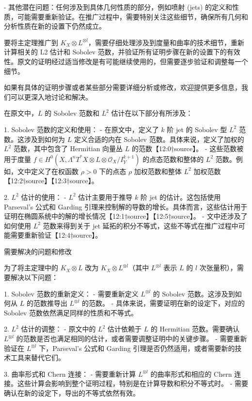 \documentclass[lang=cn,12pt,a4paper,fontset=none]{beautybook}
\begin{document}
   - 其他潜在问题：任何涉及到具体几何性质的部分，例如喷射 (jets) 的定义和性质，可能需要重新验证。在推广过程中，需要特别关注这些细节，确保所有几何和分析性质在新的设置下仍然成立。


要将主定理推广到 $K_X \otimes L^{\otimes l}$，需要仔细处理涉及到度量和曲率的技术细节，重新计算相关的 L2 估计和 Sobolev 范数，并验证所有证明步骤在新的设置下的有效性。原文的证明经过适当修改是有可能继续使用的，但需要逐步验证和调整每一个细节。

如果有具体的证明步骤或者某些部分需要详细分析或修改，欢迎提供更多信息，我们可以更深入地讨论和解决。


在原文中，$L$ 的 Sobolev 范数和 $L^2$ 估计在以下部分有所涉及：

1. Sobolev 范数的定义和使用：
   - 在原文中，定义了 $k$ 阶 jet 的 Sobolev 型 $L^2$ 范数。这涉及到如何为 $L$ 定义合适的内在 Sobolev 范数。具体来说，定义了加权的 $L^2$ 范数，其中包含了 Hermitian 向量丛 $L$ 的范数【12:0†source】。
   - 这些范数被用于度量 $f \in H^0(X, \Lambda^n T^*X \otimes L \otimes \mathcal{O}_X / I^{k+1}_Y)$ 的点态范数和整体的 $L^2$ 范数。例如，文中定义了在权函数 $\rho > 0$ 下的点态 $\rho$ 加权范数和整体 $L^2$ 加权范数【12:2†source】【12:3†source】。

2. $L^2$ 估计的使用：
   - $L^2$ 估计主要用于推导 $k$ 阶 jet 的估计。这包括使用 Parseval's 公式和 Garding 引理来控制解的导数的增长。具体而言，这些估计用于证明在椭圆系统中的解的增长情况【12:1†source】【12:5†source】。
   - 文中还涉及了如何使用 $L^2$ 范数来得到关于 jet 延拓的积分不等式，这些不等式在推广过程中可能需要重新验证【12:4†source】。

需要解决的问题和修改

为了将主定理中的 $K_X \otimes L$ 改为 $K_X \otimes L^{\otimes l}$（其中 $L^{\otimes l}$ 表示 $L$ 的 $l$ 次张量积），需要解决以下问题：

1. Sobolev 范数的重新定义：
   - 需要重新定义 $L^{\otimes l}$ 的 Sobolev 范数。这涉及到如何从 $L$ 的范数推导出 $L^{\otimes l}$ 的范数。
   - 具体来说，需要证明在新的设定下，对应的 Sobolev 范数依然满足同样的性质和不等式。

2. $L^2$ 估计的调整：
   - 原文中的 $L^2$ 估计依赖于 $L$ 的 Hermitian 范数。需要确认 $L^{\otimes l}$ 的范数是否也满足相同的估计，或者需要调整证明中的关键步骤。
   - 需要重新验证在 $L^{\otimes l}$ 下，Parseval's 公式和 Garding 引理是否仍然适用，或者需要新的技术工具来替代它们。

3. 曲率形式和 Chern 连接：
   - 需要重新计算 $L^{\otimes l}$ 的曲率形式和相应的 Chern 连接。这些计算会影响到整个证明过程，特别是在计算导数和积分不等式时。
   - 需要确认在新的设定下，导出的不等式依然有效。
\end{document}
